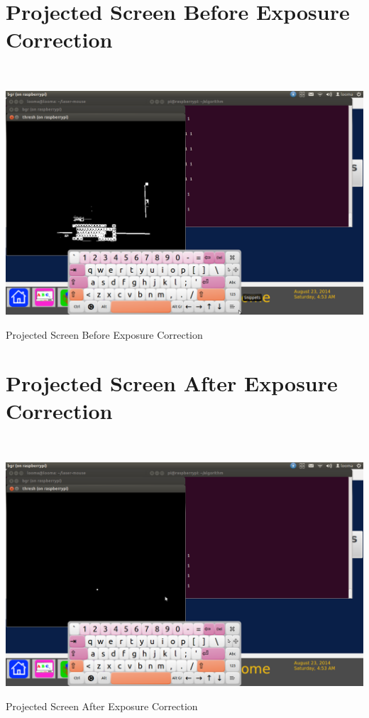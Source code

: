 \documentclass[12pt, a4paper]{article}
\begin{document}
\begin{appendices}
\section{Projected Screen Before Exposure Correction}
~\\
\begin{appendixfig}
\includegraphics[scale=0.30]{projector.png}
\caption{Projected Screen Before Exposure Correction}
\label{}
\end{appendixfig}
\newpage

\section{Projected Screen After Exposure Correction}
~\\
\begin{appendixfig}
\includegraphics[scale=0.30]{projectorwithout.png}
\caption{Projected Screen After Exposure Correction}
\label{}
\end{appendixfig}
\newpage

\end{appendices}
\end{document}
